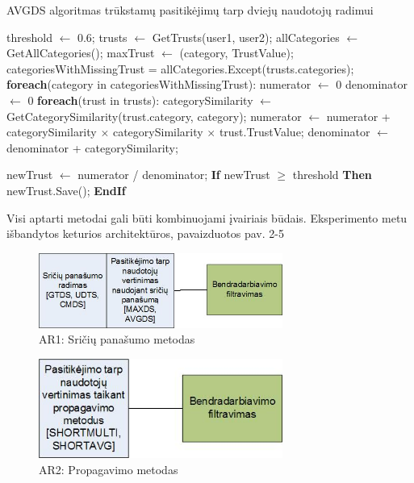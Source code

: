 \documentclass{VUMIFInfMagistrinis}
\begin{document}
\begin{algorithm}
	\caption{AVGDS algoritmas trūkstamų pasitikėjimų tarp dviejų naudotojų radimui}\label{AVGDSalg}
	\begin{algorithmic}[1]
		\State threshold $\gets$ 0.6;
		\State trusts $\gets$ GetTrusts(user1, user2);
		\State allCategories $\gets$ GetAllCategories();
		\State maxTrust $\gets$ (category, TrustValue);
		\State categoriesWithMissingTrust = allCategories.Except(trusts.categories);
		\State \textbf{foreach}(category in categoriesWithMissingTrust):
		\State \indent numerator $\gets$ 0
		\State \indent denominator $\gets$ 0
		\State \indent \textbf{foreach}(trust in trusts):
		\State \indent \indent categorySimilarity $\gets$ GetCategorySimilarity(trust.category, category);
		\State \indent \indent numerator $\gets$ numerator + categorySimilarity $\times$ categorySimilarity $\times$ trust.TrustValue;
		\State \indent \indent denominator $\gets$ denominator + categorySimilarity;
		
		\State \indent newTrust $\gets$ numerator / denominator;
		\State \indent \textbf{If} {newTrust $\ge$ threshold} \textbf{Then}
		\State \indent \indent newTrust.Save();
		\State \indent \textbf{EndIf}
		\EndProcedure
	\end{algorithmic}
\end{algorithm}
\indent
Visi aptarti metodai gali būti kombinuojami įvairiais būdais. Eksperimento metu išbandytos keturios architektūros, pavaizduotos pav. 2-5
\begin{figure}[ht!]
	\centering
	\includegraphics[width=80mm]{architectures/DS.jpg}
	\caption{AR1: Sričių panašumo metodas} 
\end{figure}
\begin{figure}[ht!]
	\centering
	\includegraphics[width=80mm]{architectures/Prop.jpg}
	\caption{AR2: Propagavimo metodas}
\end{figure}
\end{document}
